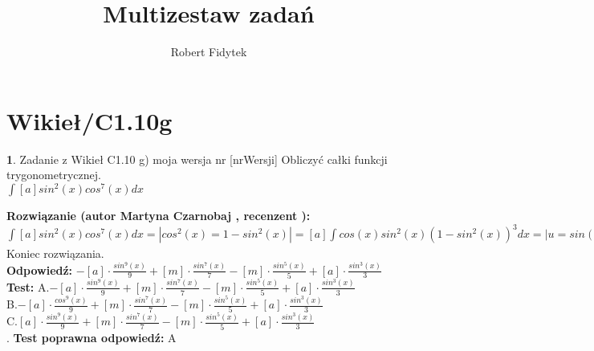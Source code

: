 \documentclass[12pt, a4paper]{article}
\title{Multizestaw zadań}
\author{Robert Fidytek}
\date{}
\theoremstyle{definition} %
\newtheorem{zad}{}
\newcommand{\kategoria}[1]{\section{#1}} %
\newcommand{\zadStart}[1]{\begin{zad}#1\newline} %
\newcommand{\zadStop}{\end{zad}}   %
\newcommand{\rozwStart}[2]{\noindent \textbf{Rozwiązanie (autor #1 , recenzent #2): }\newline} %
\newcommand{\rozwStop}{\newline}                                            %
\newcommand{\odpStart}{\noindent \textbf{Odpowiedź:}\newline}    %
\newcommand{\odpStop}{\newline}                                             %
\newcommand{\testStart}{\noindent \textbf{Test:}\newline} %
\newcommand{\testStop}{\newline} %
\newcommand{\kluczStart}{\noindent \textbf{Test poprawna odpowiedź:}\newline} %
\newcommand{\kluczStop}{\newline} %
\begin{document}
\maketitle


\kategoria{Wikieł/C1.10g}
\zadStart{Zadanie z Wikieł C1.10 g) moja wersja nr [nrWersji]}
Obliczyć całki funkcji trygonometrycznej.\\
$\int [a] sin^{2}(x) cos^{7}(x) dx$\\
\zadStop
\rozwStart{Martyna Czarnobaj}{}
	$\int [a] sin^{2}(x) cos^{7}(x) dx = | cos^{2}(x) = 1 - sin^{2}(x)| = [a] \int cos(x) sin^{2}(x) (1 - sin^{2}(x))^{3} dx = | u=sin(x), du = cos(x) dx| = [a] \int u^{2} (1 - u^{2})^{3} du = [a] \int -u^{8} + 3u^{6} - 3u^{4} + u^{2} du = [a] (- \int u^{8} du + 3 \int u^{6} du - 3 \int u^{4} du + \int u^{2} du) = [a] (-\frac{u^{9}}{9} + 3 \cdot \frac{u^{7}}{7} - 3 \cdot \frac{u^{5}}{5} + \frac{u^{3}}{3}) = -[a] \cdot \frac{u^{9}}{9} + [m] \cdot \frac{u^{7}}{7} - [m] \cdot \frac{u^{5}}{5} + [a] \cdot \frac{u^{3}}{3} = -[a] \cdot \frac{sin^{9}(x)}{9} + [m] \cdot \frac{sin^{7}(x)}{7} - [m] \cdot \frac{sin^{5}(x)}{5} + [a] \cdot \frac{sin^{3}(x)}{3}$\\ 


Koniec rozwiązania.\\
\rozwStop
\odpStart
$ -[a] \cdot \frac{sin^{9}(x)}{9} + [m] \cdot \frac{sin^{7}(x)}{7} - [m] \cdot \frac{sin^{5}(x)}{5} + [a] \cdot \frac{sin^{3}(x)}{3}$\\
\odpStop
\testStart
A.$-[a] \cdot \frac{sin^{9}(x)}{9} + [m] \cdot \frac{sin^{7}(x)}{7} - [m] \cdot \frac{sin^{5}(x)}{5} + [a] \cdot \frac{sin^{3}(x)}{3}$\\
B.$-[a] \cdot \frac{cos^{9}(x)}{9} + [m] \cdot \frac{sin^{7}(x)}{7} - [m] \cdot \frac{sin^{5}(x)}{5} + [a] \cdot \frac{sin^{3}(x)}{3}$\\
C.$[a] \cdot \frac{sin^{9}(x)}{9} + [m] \cdot \frac{sin^{7}(x)}{7} - [m] \cdot \frac{sin^{5}(x)}{5} + [a] \cdot \frac{sin^{3}(x)}{3}$\\
.
\testStop
\kluczStart
A
\kluczStop
\end{document}
